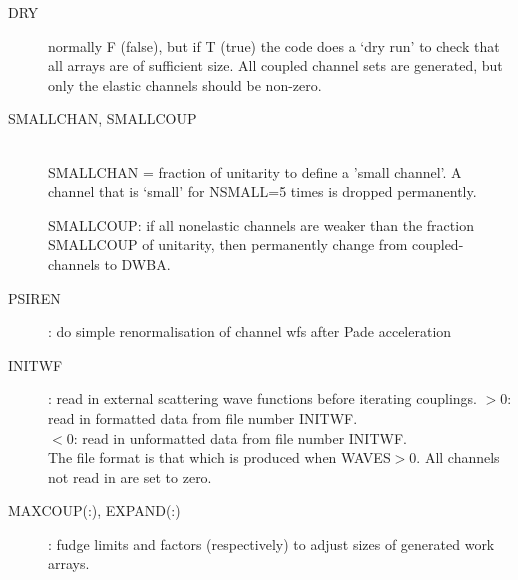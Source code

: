 \documentclass[11pt]{article}
\begin{document}
\begin{description}
\item[DRY]
normally F (false), but if T (true) the code does a `dry run'
to check that all arrays are of sufficient size.
All coupled channel sets are generated, but only the elastic
channels should be non-zero.

 \item[SMALLCHAN, SMALLCOUP] ~\\
%
SMALLCHAN = fraction of unitarity to define a 'small channel'. 
A channel that is `small' for NSMALL=5 times is dropped permanently.

SMALLCOUP: if all nonelastic channels are weaker than the fraction
SMALLCOUP of unitarity, then permanently change from coupled-channels to DWBA.


\item[PSIREN]: do simple renormalisation of channel wfs after Pade acceleration
\item[INITWF]: read in external scattering wave functions before iterating couplings.
$> 0$: read in formatted data from file number INITWF.\\
$< 0$: read in unformatted data from file number INITWF.\\
The file format is that which is produced when WAVES$>0$. 
All channels not read in are set to zero.


\item[MAXCOUP(:), EXPAND(:)]: fudge limits and factors (respectively) to adjust sizes of generated work arrays.

\end{description}
\end{document}
